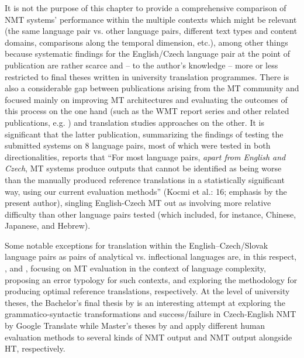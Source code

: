 \documentclass[output=paper]{langscibook}
\begin{document}
It is not the purpose of this chapter to provide a comprehensive comparison of NMT systems’ performance within the multiple contexts which might be relevant (the same language pair vs. other language pairs, different text types and content domains, comparisons along the temporal dimension, etc.), among other things because systematic findings for the English/Czech language pair at the point of publication are rather scarce and – to the author’s knowledge – more or less restricted to final theses written in university translation programmes. There is also a considerable gap between publications arising from the MT community and focused mainly on improving MT architectures and evaluating the outcomes of this process on the one hand (such as the WMT report series and other related publications, e.g. \citealt{KocmiEtAl2023}) and translation studies approaches on the other. It is significant that the latter publication, summarizing the findings of testing the submitted systems on 8 language pairs, most of which were tested in both directionalities, reports that “For most language pairs, \textit{apart from English and Czech}, MT systems produce outputs that cannot be identified as being worse than the manually produced reference translations in a statistically significant way, using our current evaluation methods” (Kocmi et al.: 16; emphasis by the present author), singling English-Czech MT out as involving more relative difficulty than other language pairs tested (which included, for instance, Chinese, Japanese, and Hebrew).

Some notable exceptions for translation within the English–Czech/Slovak language pairs as pairs of analytical vs. inflectional languages are, in this respect, \citet{MunkovaEtAl2021}, \citet{Munkova2023} and \citet{KloudováEtAl2023}, focusing on MT evaluation in the context of language complexity, proposing an error typology for such contexts, and exploring the methodology for producing optimal reference translations, respectively. At the level of university theses, the Bachelor’s final thesis by \citet{Kendová2019} is an interesting attempt at exploring the grammatico-syntactic transformations and success/failure in Czech-English NMT by Google Translate while Master’s theses by \citet{Řehořová2022} and \citet{Nováková2023} apply different human evaluation methods to several kinds of NMT output and NMT output alongside HT, respectively.
\end{document}
